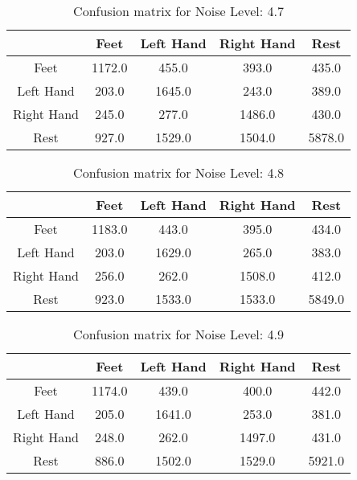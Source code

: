 \begin{table}[!htbp]
    \centering
    \begin{tabular}{|c||c|c|c|c|}
        \hline
		 & Feet & Left Hand & Right Hand & Rest \\
        \hline
        \hline
        Feet & 1172.0 & 455.0 & 393.0 & 435.0 \\
        \hline
        Left Hand & 203.0 & 1645.0 & 243.0 & 389.0 \\
        \hline
        Right Hand & 245.0 & 277.0 & 1486.0 & 430.0 \\
        \hline
        Rest & 927.0 & 1529.0 & 1504.0 & 5878.0 \\
        \hline
    \end{tabular}
    \caption{Confusion matrix for Noise Level: 4.7}
\end{table}

\begin{table}[!htbp]
    \centering
    \begin{tabular}{|c||c|c|c|c|}
        \hline
		 & Feet & Left Hand & Right Hand & Rest \\
        \hline
        \hline
        Feet & 1183.0 & 443.0 & 395.0 & 434.0 \\
        \hline
        Left Hand & 203.0 & 1629.0 & 265.0 & 383.0 \\
        \hline
        Right Hand & 256.0 & 262.0 & 1508.0 & 412.0 \\
        \hline
        Rest & 923.0 & 1533.0 & 1533.0 & 5849.0 \\
        \hline
    \end{tabular}
    \caption{Confusion matrix for Noise Level: 4.8}
\end{table}

\begin{table}[!htbp]
    \centering
    \begin{tabular}{|c||c|c|c|c|}
        \hline
		 & Feet & Left Hand & Right Hand & Rest \\
        \hline
        \hline
        Feet & 1174.0 & 439.0 & 400.0 & 442.0 \\
        \hline
        Left Hand & 205.0 & 1641.0 & 253.0 & 381.0 \\
        \hline
        Right Hand & 248.0 & 262.0 & 1497.0 & 431.0 \\
        \hline
        Rest & 886.0 & 1502.0 & 1529.0 & 5921.0 \\
        \hline
    \end{tabular}
    \caption{Confusion matrix for Noise Level: 4.9}
\end{table}

